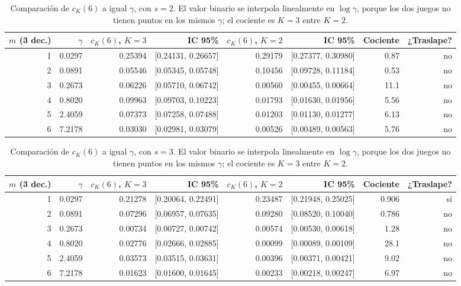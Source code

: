 \documentclass[11pt,letterpaper]{article}
\begin{document}
\begin{table}[H]
\centering
\footnotesize
\setlength{\tabcolsep}{3.5pt}
\caption{Comparación de $c_K(6)$ a igual $\gamma$, con $s=2$. El valor binario se interpola linealmente en $\log\gamma$, porque los dos juegos no tienen puntos en los mismos $\gamma$; el cociente es $K=3$ entre $K=2$.}\label{tab:comp2}
\begin{tabular}{rrrrrrrr}
\toprule
$m$ (3 dec.) & $\gamma$ & $c_K(6)$, $K=3$ & IC 95\% & $c_K(6)$, $K=2$ & IC 95\% & Cociente & ¿Traslape? \\
\midrule
1 & 0.0297 & 0.25394 & [0.24131, 0.26657] & 0.29179 & [0.27377, 0.30980] & 0.87 & no \\
2 & 0.0891 & 0.05546 & [0.05345, 0.05748] & 0.10456 & [0.09728, 0.11184] & 0.53 & no \\
3 & 0.2673 & 0.06226 & [0.05710, 0.06742] & 0.00560 & [0.00455, 0.00664] & 11.1 & no \\
4 & 0.8020 & 0.09963 & [0.09703, 0.10223] & 0.01793 & [0.01630, 0.01956] & 5.56 & no \\
5 & 2.4059 & 0.07373 & [0.07258, 0.07488] & 0.01203 & [0.01130, 0.01277] & 6.13 & no \\
6 & 7.2178 & 0.03030 & [0.02981, 0.03079] & 0.00526 & [0.00489, 0.00563] & 5.76 & no \\
\bottomrule
\end{tabular}
\end{table}
\begin{table}[H]
\centering
\footnotesize
\setlength{\tabcolsep}{3.5pt}
\caption{Comparación de $c_K(6)$ a igual $\gamma$, con $s=3$. El valor binario se interpola linealmente en $\log\gamma$, porque los dos juegos no tienen puntos en los mismos $\gamma$; el cociente es $K=3$ entre $K=2$.}\label{tab:comp3}
\begin{tabular}{rrrrrrrr}
\toprule
$m$ (3 dec.) & $\gamma$ & $c_K(6)$, $K=3$ & IC 95\% & $c_K(6)$, $K=2$ & IC 95\% & Cociente & ¿Traslape? \\
\midrule
1 & 0.0297 & 0.21278 & [0.20064, 0.22491] & 0.23487 & [0.21948, 0.25025] & 0.906 & sí \\
2 & 0.0891 & 0.07296 & [0.06957, 0.07635] & 0.09280 & [0.08520, 0.10040] & 0.786 & no \\
3 & 0.2673 & 0.00734 & [0.00727, 0.00742] & 0.00574 & [0.00530, 0.00618] & 1.28 & no \\
4 & 0.8020 & 0.02776 & [0.02666, 0.02885] & 0.00099 & [0.00089, 0.00109] & 28.1 & no \\
5 & 2.4059 & 0.03573 & [0.03515, 0.03631] & 0.00396 & [0.00371, 0.00421] & 9.02 & no \\
6 & 7.2178 & 0.01623 & [0.01600, 0.01645] & 0.00233 & [0.00218, 0.00247] & 6.97 & no \\
\bottomrule
\end{tabular}
\end{table}
\end{document}

